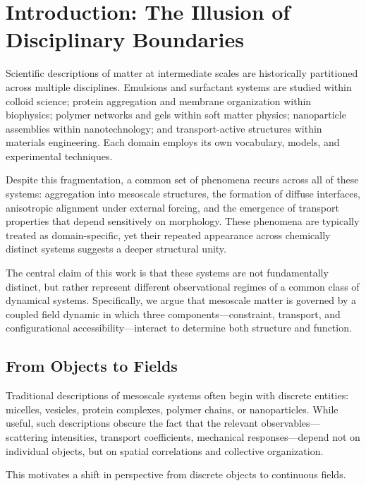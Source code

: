 \documentclass[11pt, a4paper, twocolumn]{article}
\begin{document}
\section{Introduction: The Illusion of Disciplinary Boundaries}

Scientific descriptions of matter at intermediate scales are historically
partitioned across multiple disciplines. Emulsions and surfactant systems are
studied within colloid science; protein aggregation and membrane organization
within biophysics; polymer networks and gels within soft matter physics;
nanoparticle assemblies within nanotechnology; and transport-active structures
within materials engineering. Each domain employs its own vocabulary, models,
and experimental techniques.

Despite this fragmentation, a common set of phenomena recurs across all of
these systems: aggregation into mesoscale structures, the formation of diffuse
interfaces, anisotropic alignment under external forcing, and the emergence of
transport properties that depend sensitively on morphology. These phenomena are
typically treated as domain-specific, yet their repeated appearance across
chemically distinct systems suggests a deeper structural unity.

The central claim of this work is that these systems are not fundamentally
distinct, but rather represent different observational regimes of a common
class of dynamical systems. Specifically, we argue that mesoscale matter is
governed by a coupled field dynamic in which three components---constraint,
transport, and configurational accessibility---interact to determine both
structure and function.

\subsection{From Objects to Fields}

Traditional descriptions of mesoscale systems often begin with discrete
entities: micelles, vesicles, protein complexes, polymer chains, or
nanoparticles. While useful, such descriptions obscure the fact that the
relevant observables---scattering intensities, transport coefficients,
mechanical responses---depend not on individual objects, but on spatial
correlations and collective organization.

This motivates a shift in perspective from discrete objects to continuous
fields.
\end{document}
